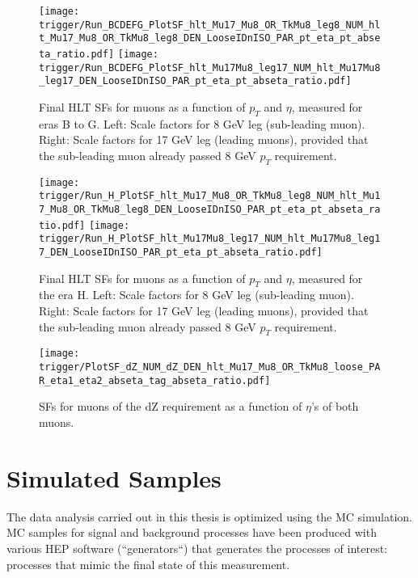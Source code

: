 \begin{small}
\begin{figure}[H]
\centering
\texttt{[image: trigger/Run\_BCDEFG\_PlotSF\_hlt\_Mu17\_Mu8\_OR\_TkMu8\_leg8\_NUM\_hlt\_Mu17\_Mu8\_OR\_TkMu8\_leg8\_DEN\_LooseIDnISO\_PAR\_pt\_eta\_pt\_abseta\_ratio.pdf]}
\texttt{[image: trigger/Run\_BCDEFG\_PlotSF\_hlt\_Mu17Mu8\_leg17\_NUM\_hlt\_Mu17Mu8\_leg17\_DEN\_LooseIDnISO\_PAR\_pt\_eta\_pt\_abseta\_ratio.pdf]}\\
\caption[Final HLT SFs for muons as a function of $p_{T}$ and $\eta$, measured for eras B to G.]{Final HLT SFs for muons as a function of $p_{T}$ and $\eta$, measured for eras B to G. Left: Scale factors for 8 GeV leg (sub-leading muon). Right: Scale factors for 17 GeV leg (leading muons), provided that the sub-leading muon already passed 8 GeV $p_T$ requirement.}
\label{fig:trigger_SF_dimu_BCDEFG}
\end{figure}

\begin{figure}[H]
\centering
\texttt{[image: trigger/Run\_H\_PlotSF\_hlt\_Mu17\_Mu8\_OR\_TkMu8\_leg8\_NUM\_hlt\_Mu17\_Mu8\_OR\_TkMu8\_leg8\_DEN\_LooseIDnISO\_PAR\_pt\_eta\_pt\_abseta\_ratio.pdf]}
\texttt{[image: trigger/Run\_H\_PlotSF\_hlt\_Mu17Mu8\_leg17\_NUM\_hlt\_Mu17Mu8\_leg17\_DEN\_LooseIDnISO\_PAR\_pt\_eta\_pt\_abseta\_ratio.pdf]}\\
\caption[Final HLT SFs for muons as a function of $p_{T}$ and $\eta$, measured for the era H.]{Final HLT SFs for muons as a function of $p_{T}$ and $\eta$, measured for the era H. Left: Scale factors for 8 GeV leg (sub-leading muon). Right: Scale factors for 17 GeV leg (leading muons), provided that the sub-leading muon already passed 8 GeV $p_T$ requirement.}
\label{fig:trigger_SF_dimu_H}
\end{figure}

\begin{figure}[H]
\centering
\texttt{[image: trigger/PlotSF\_dZ\_NUM\_dZ\_DEN\_hlt\_Mu17\_Mu8\_OR\_TkMu8\_loose\_PAR\_eta1\_eta2\_abseta\_tag\_abseta\_ratio.pdf]}
\caption[SFs for muons of the dZ requirement .]{SFs for muons of the dZ requirement as a function of $\eta$'s of both muons.}
\label{fig:trigger_SF_dimu_dZ_H}
\end{figure}

\section{Simulated Samples}
\label{sec:simulated_samples}

The data analysis carried out in this thesis is optimized using the MC simulation. MC samples for signal and background processes have been produced with various HEP software (``generators``) that generates the processes of interest: processes that mimic the final state of this measurement. 


\end{small}
